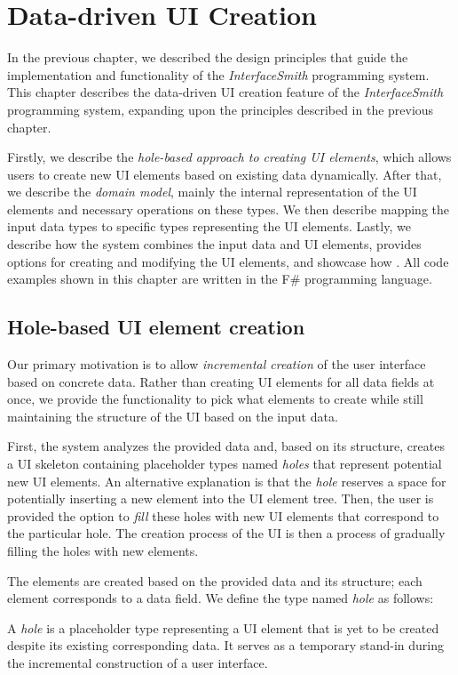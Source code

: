 \chapter{Data-driven UI Creation}
\label{chap:corelogic}

In the previous chapter, we described the design principles that guide the implementation and functionality of the \emph{InterfaceSmith} programming system.
This chapter describes the data-driven UI creation feature of the \emph{InterfaceSmith} programming system, expanding upon the principles described in the previous chapter.

Firstly, we describe the \emph{hole-based approach to creating UI elements}, which allows users to create new UI elements based on existing data dynamically.
After that, we describe the \emph{domain model}, mainly the internal representation of the UI elements and necessary operations on these types.
We then describe mapping the input data types to specific types representing the UI elements.
Lastly, we describe how the system combines the input data and UI elements, provides options for creating and modifying the UI elements, and showcase how .
All code examples shown in this chapter are written in the F\#\cite{fsharp} programming language.

\section{Hole-based UI element creation}
\label{sec:hole-based}
Our primary motivation is to allow \emph{incremental creation} of the user interface based on concrete data.
Rather than creating UI elements for all data fields at once, we provide the functionality to pick what elements to create while still maintaining the structure of the UI based on the input data.

First, the system analyzes the provided data and, based on its structure, creates a UI skeleton containing placeholder types named \emph{holes} that represent potential new UI elements.
An alternative explanation is that the \emph{hole} reserves a space for potentially inserting a new element into the UI element tree.
Then, the user is provided the option to \emph{fill} these holes with new UI elements that correspond to the particular hole.
The creation process of the UI is then a process of gradually filling the holes with new elements.

The elements are created based on the provided data and its structure; each element corresponds to a data field.
We define the type named \emph{hole} as follows:
\begin{defn}
	A \emph{hole} is a placeholder type representing a UI element that is yet to be created despite its existing corresponding data.
	It serves as a temporary stand-in during the incremental construction of a user interface.
\end{defn}

